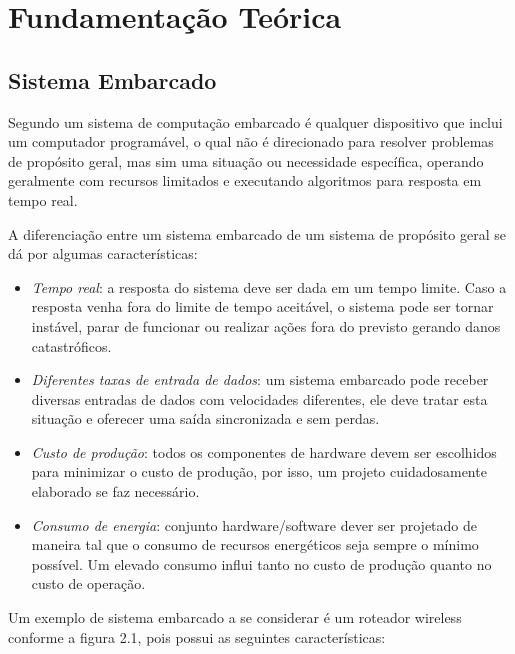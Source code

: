 ﻿\chapter{Fundamenta\c{c}\~{a}o Te\'{o}rica}
\label{cap:fundamentacao teorica}


\section{Sistema Embarcado}

Segundo \textcite{Wolf:2001} um sistema de computação embarcado é qualquer dispositivo que inclui um computador programável, o qual não é direcionado para resolver problemas de propósito geral, mas sim uma situação ou necessidade específica, operando geralmente com recursos limitados e executando algoritmos para resposta em tempo real.

A diferenciação entre um sistema embarcado de um sistema de propósito geral se dá por algumas características:
\begin{itemize}
	\item \emph{Tempo real}: a resposta do sistema deve ser dada em um tempo limite. Caso a resposta venha fora do limite de tempo aceitável, o sistema pode ser tornar instável, parar de funcionar ou realizar ações fora do previsto gerando danos catastróficos. 
	\item \emph{Diferentes taxas de entrada de dados}: um sistema embarcado pode receber diversas entradas de dados com velocidades diferentes, ele deve tratar esta situação e oferecer uma saída sincronizada e sem perdas.
	\item \emph{Custo de produção}: todos os componentes de hardware devem ser escolhidos para minimizar o custo de produção, por isso, um projeto cuidadosamente elaborado se faz necessário.
	\item \emph{Consumo de energia}: conjunto hardware/software dever ser projetado de maneira tal que o consumo de recursos energéticos seja sempre o mínimo possível. Um elevado consumo influi tanto no custo de produção  quanto no custo de operação.
\end{itemize}

Um exemplo de sistema embarcado a se considerar é um roteador wireless conforme a figura 2.1, pois possui as seguintes características:

